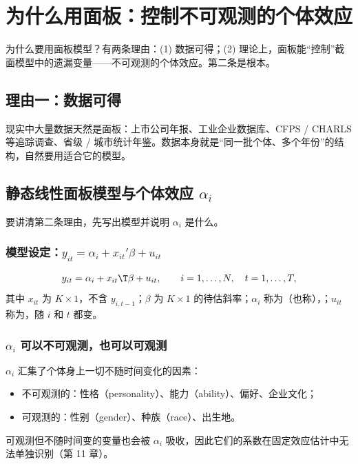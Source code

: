 \section{为什么用面板：控制不可观测的个体效应}\label{sec:U10a-why}

为什么要用面板模型？有两条理由：(1) 数据可得；(2) 理论上，面板能“控制”截面模型中的遗漏变量——不可观测的个体效应。第二条是根本。

\subsection{理由一：数据可得}

现实中大量数据天然是面板：上市公司年报、工业企业数据库、CFPS / CHARLS 等追踪调查、省级 / 城市统计年鉴。数据本身就是“同一批个体、多个年份”的结构，自然要用适合它的模型。

\subsection{静态线性面板模型与个体效应 \texorpdfstring{$\alpha_i$}{alpha\_i}}

要讲清第二条理由，先写出模型并说明 $\alpha_i$ 是什么。

\subsubsection{模型设定：\texorpdfstring{$y_{it}=\alpha_i+x_{it}'\beta+u_{it}$}{y = alpha + x'beta + u}}

\begin{defn}[静态线性面板模型]\label{def:U10a-static}
\begin{equation}\label{eq:U10a-static}
y_{it}=\alpha_i+x_{it}\T\beta+u_{it},\qquad i=1,\dots,N,\quad t=1,\dots,T,
\end{equation}
其中 $x_{it}$ 为 $K\times1$，不含 $y_{i,t-1}$；$\beta$ 为 $K\times 1$ 的待估斜率；$\alpha_i$ 称为（也称），；$u_{it}$ 称为，随 $i$ 和 $t$ 都变。
\end{defn}

\subsubsection{\texorpdfstring{$\alpha_i$}{alpha\_i} 可以不可观测，也可以可观测}

$\alpha_i$ 汇集了个体身上一切不随时间变化的因素：
\begin{itemize}
  \item 不可观测的：性格（personality）、能力（ability）、偏好、企业文化；
  \item 可观测的：性别（gender）、种族（race）、出生地。
\end{itemize}
可观测但不随时间变的变量也会被 $\alpha_i$ 吸收，因此它们的系数在固定效应估计中无法单独识别（第 11 章）。


